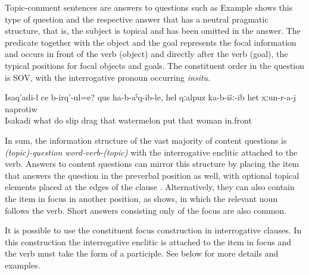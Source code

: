 Topic-comment sentences are answers to questions such as  Example  shows this type of question and the respective answer that has a neutral pragmatic structure, that is, the subject is topical and has been omitted in the answer. The predicate together with the object and the goal represents the focal information and occurs in front of the verb (object) and directly after the verb (goal), the typical positions for focal objects and goals. The constituent order in the question is SOV, with the interrogative pronoun occurring \textit{insitu}.
%
\begin{exe}
	\ex	\label{ex:What is Isakadi doing? He dragged the watermelon and put it in front of the women}
	\gll	Isaq'adi-l	ce	b-irq'-ul=e?	qus	ha-b-aˁq-ib-le,	hel	qːalpuz	ka-b-išː-ib	het	xːun-r-a-j	naprotiw\\
		Isakadi what	do	slip	drag	that watermelon	put	that	woman in.front\\
	\glt	{}
\end{exe}

In sum, the information structure of the vast majority of content questions is \textit{(topic)-question word-verb-(topic)} with the interrogative enclitic attached to the verb. Answers to content questions can mirror this structure by placing the item that answers the question in the preverbal position as well, with optional topical elements placed at the edges of the clause . Alternatively, they can also contain the item in focus in another position, as  shows, in which the relevant noun follows the verb. Short answers consisting only of the focus are also common.

It is possible to use the constituent focus construction in interrogative clauses. In this construction the interrogative enclitic is attached to the item in focus and the verb must take the form of a participle. See  below for more details and examples.




